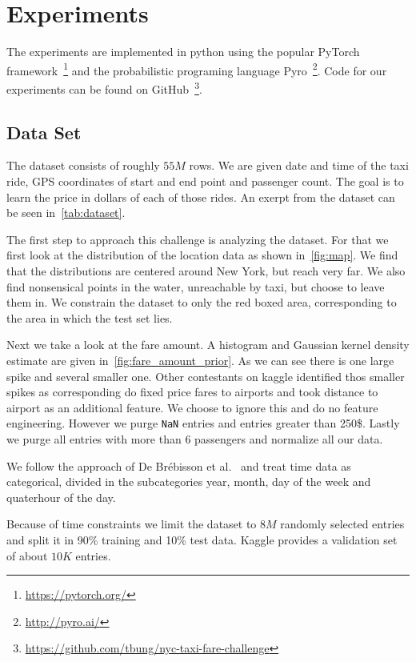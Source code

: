 \section{Experiments}%
\label{sec:experiments}

The experiments are implemented in python using the popular PyTorch
framework~\footnote{\url{https://pytorch.org/}} and the probabilistic
programing language Pyro~\footnote{\url{http://pyro.ai/}}. Code for our
experiments can be found on
GitHub~\footnote{\url{https://github.com/tbung/nyc-taxi-fare-challenge}}.

\subsection{Data Set}%
\label{sub:dataset}

The dataset consists of roughly $55M$ rows. We are given date and time of the
taxi ride, GPS coordinates of start and end point and passenger count. The goal
is to learn the price in dollars of each of those rides. An exerpt from the
dataset can be seen in~\autoref{tab:dataset}.

The first step to approach this challenge is analyzing the dataset. For that we
first look at the distribution of the location data as shown
in~\autoref{fig:map}. We find that the distributions are centered around New
York, but reach very far. We also find nonsensical points in the water,
unreachable by taxi, but choose to leave them in. We constrain the dataset to
only the red boxed area, corresponding to the area in which the test set lies.

Next we take a look at the fare amount. A histogram and Gaussian kernel density
estimate are given in~\autoref{fig:fare_amount_prior}. As we can see there is
one large spike and several smaller one. Other contestants on kaggle identified
thos smaller spikes as corresponding do fixed price fares to airports and took
distance to airport as an additional feature. We choose to ignore this and do
no feature engineering. However we purge \verb|NaN| entries and entries greater
than 250\$. Lastly we purge all entries with more than 6 passengers and
normalize all our data.

We follow the approach of De Br{\'e}bisson et al.~\cite{de2015artificial} and
treat time data as categorical, divided in the subcategories year, month, day
of the week and quaterhour of the day.

Because of time constraints we limit the dataset to $8M$ randomly selected
entries and split it in 90\% training and 10\% test data. Kaggle provides a
validation set of about $10K$ entries.


